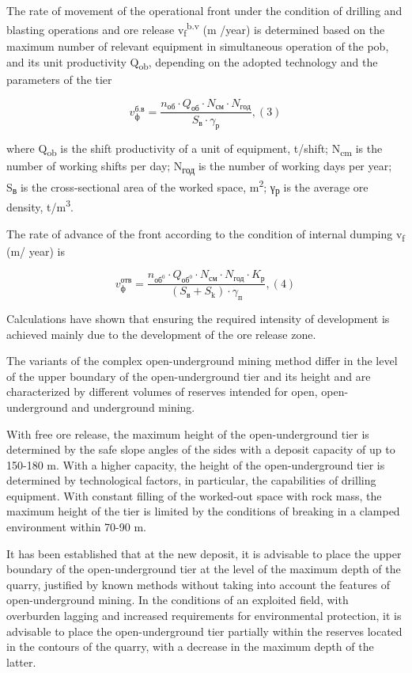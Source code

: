 \begin{multicols}{2}
The rate of movement of the operational front under the condition of
drilling and blasting operations and ore release
v\textsubscript{f}\textsuperscript{b.v} (m /year) is determined based on
the maximum number of relevant equipment in simultaneous operation of
the pob, and its unit productivity Q\textsubscript{ob}, depending on the
adopted technology and the parameters of the tier

\[v_{\text{ф}}^{\text{б.в}} = \frac{n_{\text{об}} \cdot Q_{\text{об}} \cdot N_{\text{см}} \cdot N_{\text{год}}}{S_{\text{в}} \cdot \gamma_{\text{р}}},(3)\]

where Q\textsubscript{ob} is the shift productivity of a unit of
equipment, t/shift; N\textsubscript{cm} is the number of working shifts
per day; N\textsubscript{год} is the number of working days per year;
S\textsubscript{в} is the cross-sectional area of the worked space,
m\textsuperscript{2}; γ\textsubscript{р} is the average ore density,
t/m\textsuperscript{3}.

The rate of advance of the front according to the condition of internal
dumping v\textsubscript{f} (m/ year) is

\[v_{\text{ф}}^{\text{отв}} = \frac{n_{\text{об}^{0}} \cdot Q_{\text{об}^{0}} \cdot N_{\text{см}} \cdot N_{\text{год}} \cdot K_{\text{р}}}{(S_{\text{в}} + S_{\text{k}}) \cdot \gamma_{\text{п}}},(4)\]

Calculations have shown that ensuring the required intensity of
development is achieved mainly due to the development of the ore release
zone.

The variants of the complex open-underground mining method differ in the
level of the upper boundary of the open-underground tier and its height
and are characterized by different volumes of reserves intended for
open, open-underground and underground mining.

With free ore release, the maximum height of the open-underground tier
is determined by the safe slope angles of the sides with a deposit
capacity of up to 150-180 m. With a higher capacity, the height of the
open-underground tier is determined by technological factors, in
particular, the capabilities of drilling equipment. With constant
filling of the worked-out space with rock mass, the maximum height of
the tier is limited by the conditions of breaking in a clamped
environment within 70-90 m.

It has been established that at the new deposit, it is advisable to
place the upper boundary of the open-underground tier at the level of
the maximum depth of the quarry, justified by known methods without
taking into account the features of open-underground mining. In the
conditions of an exploited field, with overburden lagging and increased
requirements for environmental protection, it is advisable to place the
open-underground tier partially within the reserves located in the
contours of the quarry, with a decrease in the maximum depth of the
latter.


\end{multicols}
